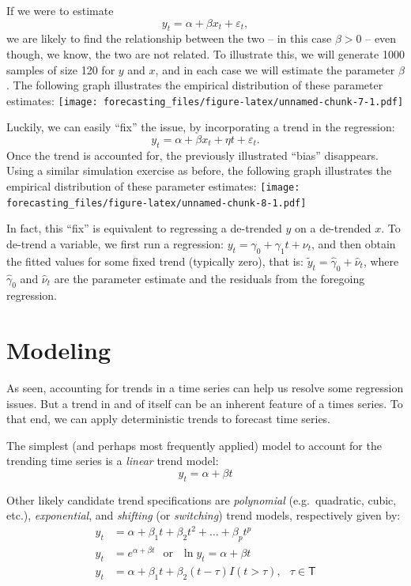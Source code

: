 \documentclass[
  12pt,
  oneside]{book}
\begin{document}
If we were to estimate \[y_t = \alpha+\beta x_t + \varepsilon_t,\] we are likely to find the relationship between the two -- in this case \(\beta>0\) -- even though, we know, the two are not related. To illustrate this, we will generate 1000 samples of size 120 for \(y\) and \(x\), and in each case we will estimate the parameter \(\beta\). The following graph illustrates the empirical distribution of these parameter estimates:
\texttt{[image: forecasting\_files/figure-latex/unnamed-chunk-7-1.pdf]}

Luckily, we can easily ``fix'' the issue, by incorporating a trend in the regression: \[y_t = \alpha+\beta x_t + \eta t + \varepsilon_t.\] Once the trend is accounted for, the previously illustrated ``bias'' disappears. Using a similar simulation exercise as before, the following graph illustrates the empirical distribution of these parameter estimates:
\texttt{[image: forecasting\_files/figure-latex/unnamed-chunk-8-1.pdf]}

In fact, this ``fix'' is equivalent to regressing a de-trended \(y\) on a de-trended \(x\). To de-trend a variable, we first run a regression: \(y_t = \gamma_0 + \gamma_1 t + \nu_t\), and then obtain the fitted values for some fixed trend (typically zero), that is: \(\tilde{y}_t = \hat{\gamma}_0+\hat{\nu}_t\), where \(\hat{\gamma}_0\) and \(\hat{\nu}_t\) are the parameter estimate and the residuals from the foregoing regression.

\hypertarget{modeling}{%
\section{Modeling}\label{modeling}}

As seen, accounting for trends in a time series can help us resolve some regression issues. But a trend in and of itself can be an inherent feature of a times series. To that end, we can apply deterministic trends to forecast time series.

The simplest (and perhaps most frequently applied) model to account for the trending time series is a \emph{linear} trend model: \[y_t = \alpha + \beta t\]

Other likely candidate trend specifications are \emph{polynomial} (e.g.~quadratic, cubic, etc.), \emph{exponential}, and \emph{shifting} (or \emph{switching}) trend models, respectively given by:
\[\begin{aligned}
    y_t &= \alpha + \beta_1 t + \beta_2 t^2 + \ldots + \beta_p t^p \\
    y_t &= e^{\alpha + \beta t}\;~~\mbox{or}\;~~\ln{y_t} = \alpha + \beta t \\
    y_t &= \alpha + \beta_1 t + \beta_2 (t-\tau)I(t>\tau),\;~~\tau\in\mathsf{T} 
    \end{aligned}\]
\end{document}
